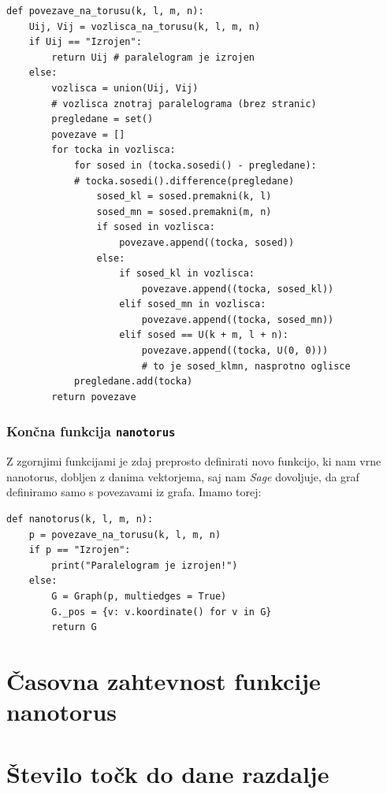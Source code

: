 \documentclass[a4paper, 11 pt]{article}
\begin{document}
\begin{verbatim}
def povezave_na_torusu(k, l, m, n):
    Uij, Vij = vozlisca_na_torusu(k, l, m, n)
    if Uij == "Izrojen":
        return Uij # paralelogram je izrojen
    else:
        vozlisca = union(Uij, Vij) 
        # vozlisca znotraj paralelograma (brez stranic)
        pregledane = set()
        povezave = []
        for tocka in vozlisca:
            for sosed in (tocka.sosedi() - pregledane): 
            # tocka.sosedi().difference(pregledane)
                sosed_kl = sosed.premakni(k, l)
                sosed_mn = sosed.premakni(m, n)
                if sosed in vozlisca:
                    povezave.append((tocka, sosed))
                else:
                    if sosed_kl in vozlisca:
                        povezave.append((tocka, sosed_kl))
                    elif sosed_mn in vozlisca:
                        povezave.append((tocka, sosed_mn))
                    elif sosed == U(k + m, l + n):
                        povezave.append((tocka, U(0, 0))) 
                        # to je sosed_klmn, nasprotno oglisce
            pregledane.add(tocka)
        return povezave 
\end{verbatim}

\subsubsection{Končna funkcija \texttt{nanotorus}}

Z zgornjimi funkcijami je zdaj preprosto definirati novo funkcijo, ki nam vrne nanotorus, dobljen z danima vektorjema, saj nam \textit{Sage} dovoljuje, da graf definiramo samo s povezavami iz grafa.  Imamo torej:

\begin{verbatim}
def nanotorus(k, l, m, n):
    p = povezave_na_torusu(k, l, m, n)
    if p == "Izrojen":
        print("Paralelogram je izrojen!")
    else:
        G = Graph(p, multiedges = True)
        G._pos = {v: v.koordinate() for v in G}
        return G
\end{verbatim}

\section{Časovna zahtevnost funkcije nanotorus}

\section{Število točk do dane razdalje}
\end{document}
